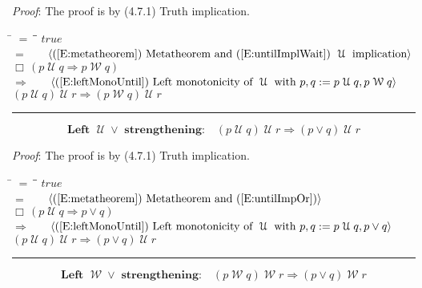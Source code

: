\documentclass[12pt, fleqn, leqno]{article}
\newcommand{\lgap}{2pt}                             %
\newcommand{\mymathindent}{24pt}                    %
\newcommand{\impl}{\ensuremath{\Rightarrow}}        %
\newcommand{\Until}{\;\mathcal{U}\;}
\newcommand{\Wait}{\;\mathcal{W}\;}
\newcommand{\Always}{\Box\,}
\newcommand{\myqed}{\rule[-.23ex]{1.2ex}{2.0ex}}
\newcommand{\myqedtab}{\hspace{384pt}}              %
\newcommand{\Gll} {\langle}                         %
\newcommand{\Ggg} {\rangle}                         %
\newcommand{\Hint}[1]     {\ \ \ $\Gll              \mbox{#1} \Ggg$ }   %
\begin{document}
\emph{Proof}: The proof is by (4.7.1) Truth implication.
\begin{tabbing}
\hspace{\mymathindent} \= $= \;$ \= \myqedtab \= \kill
  \> \>   $true$\\[\lgap]
  \> $=$ \> \Hint{(\ref{E:metatheorem}) Metatheorem and (\ref{E:untilImplWait}) $\Until$ implication} \\[\lgap]
  \> \>   $\Always (p \Until q \impl p\Wait q)$\\[\lgap]
  \> $\impl$  \>  \Hint{(\ref{E:leftMonoUntil}) Left monotonicity of $\Until$ with $p,q := p \Until q, p\Wait q$}\\[\lgap]
  \> \>   $(p\Until q)\Until r\impl (p\Wait q)\Until r$ \quad \myqed
\end{tabbing}
\begin{equation}\label{E:untilImpAbsR}
\textbf{Left $\Until\lor$ strengthening:}\quad (p \Until q) \Until r \impl (p \lor q) \Until r
\end{equation}

\emph{Proof}: The proof is by (4.7.1) Truth implication.
\begin{tabbing}
\hspace{\mymathindent} \= $= \;$ \= \myqedtab \= \kill
  \> \>   $true$\\[\lgap]
  \> $=$ \> \Hint{(\ref{E:metatheorem}) Metatheorem and (\ref{E:untilImpOr})} \\[\lgap]
  \> \>   $\Always (p\Until q\impl p\lor q)$\\[\lgap]
  \> $\impl$  \>  \Hint{(\ref{E:leftMonoUntil}) Left monotonicity of $\Until$ with $p,q := p\Until q, p\lor q$}\\[\lgap]
  \> \>   $(p \Until q) \Until r \impl (p \lor q) \Until r$ \quad \myqed
\end{tabbing}
\begin{equation}\label{E:waitImpAbsR}
\textbf{Left $\Wait\lor$ strengthening:}\quad (p \Wait q) \Wait r \impl (p \lor q) \Wait r
\end{equation}
\end{document}
